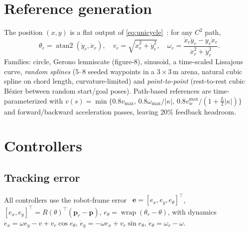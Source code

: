 \documentclass[11pt,a4paper]{article}
\newcommand{\wrap}{\operatorname{wrap}}
\begin{document}
\section{Reference generation}
The position $(x,y)$ is a flat output of \eqref{eq:unicycle}~\cite{oriolo2002}: for any $C^2$ path,
\begin{equation}
\theta_r=\operatorname{atan2}(\dot y_r,\dot x_r),\quad v_r=\sqrt{\dot x_r^2+\dot y_r^2},\quad \omega_r=\frac{\dot x_r\ddot y_r-\dot y_r\ddot x_r}{\dot x_r^2+\dot y_r^2}.
\end{equation}
Families: circle, Gerono lemniscate (figure-8), sinusoid, a time-scaled Lissajous curve, \emph{random splines} (5--8 seeded waypoints in a $3\times3$\,m arena, natural cubic spline on chord length, curvature-limited) and \emph{point-to-point} (rest-to-rest cubic B\'ezier between random start/goal poses). Path-based references are time-parameterized with $v(s)=\min\{0.8v_{\max},\,0.8\omega_{\max}/|\kappa|,\,0.8v_w^{\max}/(1+\tfrac L2|\kappa|)\}$ and forward/backward acceleration passes, leaving 20\% feedback headroom.

\section{Controllers}
\subsection{Tracking error}
All controllers use the robot-frame error~\cite{kanayama1990}
$\bm{e}=[e_x,e_y,e_\theta]^\top$, $[e_x,e_y]^\top=R(\theta)^\top(\bm p_r-\bm p)$, $e_\theta=\wrap(\theta_r-\theta)$, with dynamics
$\dot e_x=\omega e_y-v+v_r\cos e_\theta$, $\dot e_y=-\omega e_x+v_r\sin e_\theta$, $\dot e_\theta=\omega_r-\omega$.
\end{document}

